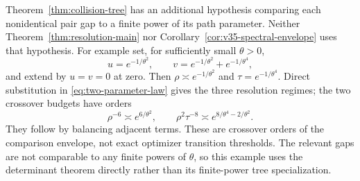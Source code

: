 \begin{remark}
\label{rem:v35-flat-path}
Theorem~\ref{thm:collision-tree} has an additional hypothesis comparing
each nonidentical pair gap to a finite power of its path parameter.
Neither Theorem~\ref{thm:resolution-main} nor
Corollary~\ref{cor:v35-spectral-envelope} uses that hypothesis.
For example set, for sufficiently small $\theta>0$,
\[
 u=e^{-1/\theta^2},\qquad
 v=e^{-1/\theta^2}+e^{-1/\theta^4},
\]
and extend by $u=v=0$ at zero. Then
$\rho\asymp e^{-1/\theta^2}$ and
$\tau=e^{-1/\theta^4}$. Direct substitution in
\eqref{eq:two-parameter-law} gives the three resolution regimes;
the two crossover budgets have orders
\[
 \rho^{-6}\asymp e^{6/\theta^2},\qquad
 \rho^2\tau^{-8}\asymp e^{8/\theta^4-2/\theta^2}.
\]
They follow by balancing adjacent terms. These are crossover orders of
the comparison envelope, not exact optimizer transition thresholds. The relevant gaps are not
comparable to any finite powers of $\theta$, so this example uses
the determinant theorem directly rather than its finite-power tree
specialization.
\end{remark}

